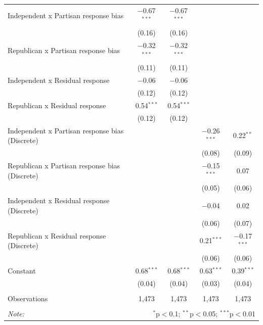 \documentclass{article}\usepackage[]{graphicx}\usepackage[]{xcolor}
\begin{document}
\begin{table}[H]
\begin{tabular}{@{\extracolsep{5pt}}lcccc}
  Independent x Partisan response bias & $-$0.67$^{***}$ & $-$0.67$^{***}$ &  &  \\ 
  & (0.16) & (0.16) &  &  \\ 
  Republican x Partisan response bias & $-$0.32$^{***}$ & $-$0.32$^{***}$ &  &  \\ 
  & (0.11) & (0.11) &  &  \\ 
  Independent x Residual response & $-$0.06 & $-$0.06 &  &  \\ 
  & (0.12) & (0.12) &  &  \\ 
  Republican x Residual response & 0.54$^{***}$ & 0.54$^{***}$ &  &  \\ 
  & (0.12) & (0.12) &  &  \\ 
  Independent x Partisan response bias (Discrete) &  &  & $-$0.26$^{***}$ & 0.22$^{**}$ \\ 
  &  &  & (0.08) & (0.09) \\ 
  Republican x Partisan response bias (Discrete) &  &  & $-$0.15$^{***}$ & 0.07 \\ 
  &  &  & (0.05) & (0.06) \\ 
  Independent x Residual response (Discrete) &  &  & $-$0.04 & 0.02 \\ 
  &  &  & (0.06) & (0.07) \\ 
  Republican x Residual response (Discrete) &  &  & 0.21$^{***}$ & $-$0.17$^{***}$ \\ 
  &  &  & (0.06) & (0.06) \\ 
  Constant & 0.68$^{***}$ & 0.68$^{***}$ & 0.63$^{***}$ & 0.39$^{***}$ \\ 
  & (0.04) & (0.04) & (0.03) & (0.04) \\ 
 \hline \\[-1.8ex] 
Observations & 1,473 & 1,473 & 1,473 & 1,473 \\ 
\hline 
\hline \\[-1.8ex] 
\textit{Note:}  & \multicolumn{4}{r}{$^{*}$p$<$0.1; $^{**}$p$<$0.05; $^{***}$p$<$0.01} \\ 
\end{tabular} 

\end{table}
\end{document}
